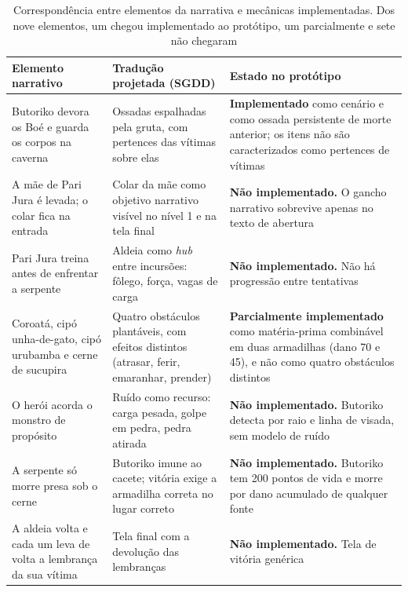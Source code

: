\documentclass[conference]{IEEEtran}
\begin{document}
\begin{table}[t]
\caption{Correspondência entre elementos da narrativa e mecânicas implementadas. Dos nove elementos, um chegou implementado ao protótipo, um parcialmente e sete não chegaram}
\label{tab:mito}
\centering
\footnotesize
\begin{tabular}{p{3.9cm}p{5.6cm}p{5.6cm}}
\toprule
\textbf{Elemento narrativo} & \textbf{Tradução projetada (SGDD)} & \textbf{Estado no protótipo} \\
\midrule
Butoriko devora os Boé e guarda os corpos na caverna &
Ossadas espalhadas pela gruta, com pertences das vítimas sobre elas &
\textbf{Implementado} como cenário e como ossada persistente de morte anterior; os itens não são caracterizados como pertences de vítimas \\[2pt]

A mãe de Pari Jura é levada; o colar fica na entrada &
Colar da mãe como objetivo narrativo visível no nível 1 e na tela final &
\textbf{Não implementado.} O gancho narrativo sobrevive apenas no texto de abertura \\[2pt]

Pari Jura treina antes de enfrentar a serpente &
Aldeia como \textit{hub} entre incursões: fôlego, força, vagas de carga &
\textbf{Não implementado.} Não há progressão entre tentativas \\[2pt]

Coroatá, cipó unha-de-gato, cipó urubamba e cerne de sucupira &
Quatro obstáculos plantáveis, com efeitos distintos (atrasar, ferir, emaranhar, prender) &
\textbf{Parcialmente implementado} como matéria-prima combinável em duas armadilhas (dano 70 e 45), e não como quatro obstáculos distintos \\[2pt]

O herói acorda o monstro de propósito &
Ruído como recurso: carga pesada, golpe em pedra, pedra atirada &
\textbf{Não implementado.} Butoriko detecta por raio e linha de visada, sem modelo de ruído \\[2pt]

A serpente só morre presa sob o cerne &
Butoriko imune ao cacete; vitória exige a armadilha correta no lugar correto &
\textbf{Não implementado.} Butoriko tem 200 pontos de vida e morre por dano acumulado de qualquer fonte \\[2pt]

A aldeia volta e cada um leva de volta a lembrança da sua vítima &
Tela final com a devolução das lembranças &
\textbf{Não implementado.} Tela de vitória genérica \\[2pt]


\end{tabular}
\end{table}
\end{document}
